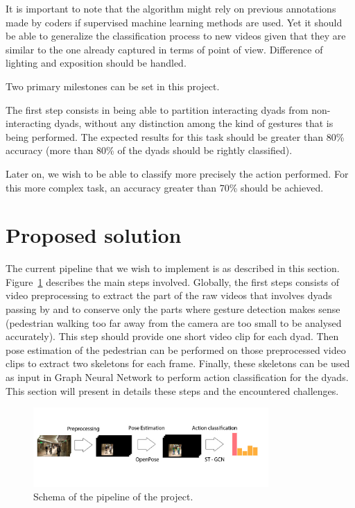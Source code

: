 \documentclass[12pt,a4paper,twoside]{article}
\begin{document}
It is important to note that the algorithm might rely on previous annotations made by coders if supervised machine learning methods are used. Yet it should be able to generalize the classification process to new videos given that they are similar to the one already captured in terms of point of view. Difference of lighting and exposition should be handled.

Two primary milestones can be set in this project.

The first step consists in being able to partition interacting dyads from non-interacting dyads, without any distinction among the kind of gestures that is being performed. The expected results for this task should be greater than 80\% accuracy (more than 80\% of the dyads should be rightly classified).

Later on, we wish to be able to classify more precisely the action performed. For this more complex task, an accuracy greater than 70\% should be achieved. 


\section{Proposed solution}

The current pipeline that we wish to implement is as described in this section. Figure~\ref{fig:pipeline} describes the main steps involved. Globally, the first steps consists of video preprocessing to extract the part of the raw videos that involves dyads passing by and to conserve only the parts where gesture detection makes sense (pedestrian walking too far away from the camera are too small to be analysed accurately). This step should provide one short video clip for each dyad. Then pose estimation of the pedestrian can be performed on those preprocessed video clips to extract two skeletons for each frame. Finally, these skeletons can be used as input in Graph Neural Network to perform action classification for the dyads. This section will present in details these steps and the encountered challenges.  

\begin{figure}
    \centering
        \includegraphics[width=0.8\textwidth]{images/pipeline}
    \caption{Schema of the pipeline of the project.}
    \label{fig:pipeline}
\end{figure}
\end{document}
